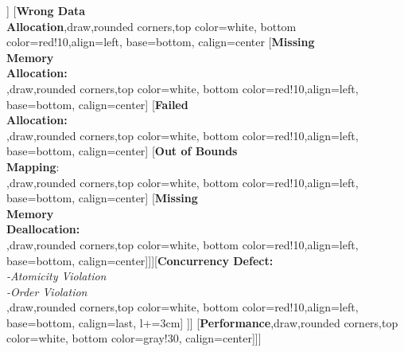 \documentclass[10pt]{standalone}
\begin{document}
{\begin{forest}
				[\textbf{Missing}\\ \textbf{Data}:  \\,draw,rounded corners,top color=white, bottom color=red!10,align=left, base=bottom, calign=center]]
			[\textbf{Wrong Data}\\\textbf{Allocation},draw,rounded corners,top color=white, bottom color=red!10,align=left, base=bottom, calign=center
				[\textbf{Missing}\\\textbf{Memory}\\\textbf{Allocation:  }\\,draw,rounded corners,top color=white, bottom color=red!10,align=left, base=bottom, calign=center]
				[\textbf{Failed}\\\textbf{Allocation:  }\\,draw,rounded corners,top color=white, bottom color=red!10,align=left, base=bottom, calign=center]
				[\textbf{Out of Bounds}\\ \textbf{Mapping}:  \\,draw,rounded corners,top color=white, bottom color=red!10,align=left, base=bottom, calign=center]
				[\textbf{Missing}\\\textbf{Memory}\\\textbf{Deallocation:  }\\,draw,rounded corners,top color=white, bottom color=red!10,align=left, base=bottom, calign=center]]][\textbf{Concurrency Defect:  }\\\textit{-Atomicity Violation}\\\textit{-Order Violation}\\,draw,rounded corners,top color=white, bottom color=red!10,align=left, base=bottom, calign=last, l+=3cm]		
		]]		
		[\textbf{Performance},draw,rounded corners,top color=white, bottom color=gray!30, calign=center]]]
\end{forest}
}
\end{document}
